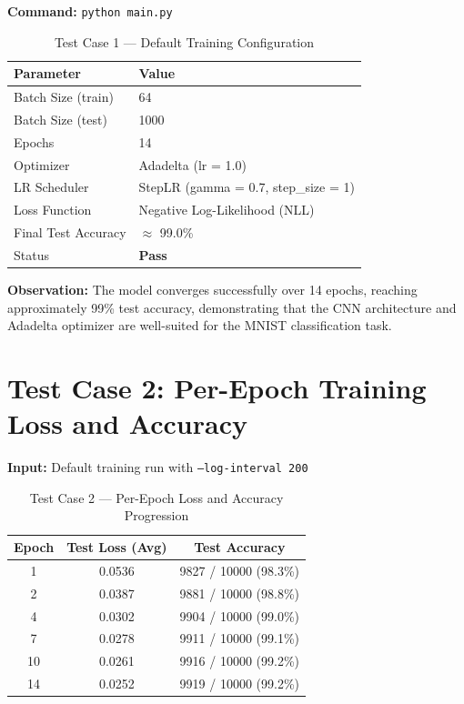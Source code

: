 \documentclass[12pt,a4paper,openany]{report}
\begin{document}
\textbf{Command:} \texttt{python main.py}

\begin{table}[H]
\centering
\begin{tabular}{|l|p{9cm}|}
\hline
\textbf{Parameter}      & \textbf{Value} \\
\hline
Batch Size (train)      & 64 \\
Batch Size (test)       & 1000 \\
Epochs                  & 14 \\
Optimizer               & Adadelta (lr = 1.0) \\
LR Scheduler            & StepLR (gamma = 0.7, step\_size = 1) \\
Loss Function           & Negative Log-Likelihood (NLL) \\
Final Test Accuracy     & $\approx$ 99.0\% \\
Status                  & \textbf{Pass} \\
\hline
\end{tabular}
\caption{Test Case 1 --- Default Training Configuration}
\end{table}

\textbf{Observation:} The model converges successfully over 14 epochs, reaching approximately 99\% test accuracy, demonstrating that the CNN architecture and Adadelta optimizer are well-suited for the MNIST classification task.

\section{Test Case 2: Per-Epoch Training Loss and Accuracy}

\textbf{Input:} Default training run with \texttt{--log-interval 200}

\begin{table}[H]
\centering
\begin{tabular}{|c|c|c|}
\hline
\textbf{Epoch} & \textbf{Test Loss (Avg)} & \textbf{Test Accuracy} \\
\hline
1  & 0.0536 & 9827 / 10000 (98.3\%) \\
2  & 0.0387 & 9881 / 10000 (98.8\%) \\
4  & 0.0302 & 9904 / 10000 (99.0\%) \\
7  & 0.0278 & 9911 / 10000 (99.1\%) \\
10 & 0.0261 & 9916 / 10000 (99.2\%) \\
14 & 0.0252 & 9919 / 10000 (99.2\%) \\
\hline
\end{tabular}
\caption{Test Case 2 --- Per-Epoch Loss and Accuracy Progression}
\end{table}
\end{document}
